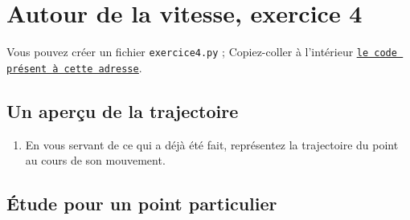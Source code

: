 \documentclass[11pt]{article}
\begin{document}


\section{Autour de la vitesse, exercice 4}





\bigskip



Vous pouvez créer un fichier \texttt{exercice4.py} ; Copiez-coller à l'intérieur \href{https://github.com/formationPythonPC-Juin/aides-formation/blob/master/exercice4-aide.py}{\underline{\texttt{le code présent à cette adresse}}}. 



\subsection{Un aperçu de la trajectoire}

\begin{enumerate}
 \item En vous servant de ce qui a déjà été fait, représentez la trajectoire du point au cours de son mouvement.

\end{enumerate}




\subsection{Étude pour un point particulier}
\end{document}
